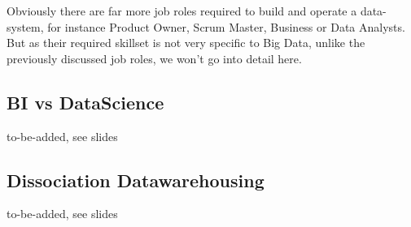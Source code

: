 Obviously there are far more job roles required to build and operate a data-system, for instance Product Owner, Scrum Master, Business or Data Analysts. But as their required skillset is not very specific to Big Data, unlike the previously discussed job roles, we won't go into detail here.

\subsection{BI vs DataScience}
\label{bd_bdib_bi_vs_datascience}
to-be-added, see slides


\subsection{Dissociation Datawarehousing}
\label{bd_bdib_diss_dwh}
to-be-added, see slides


